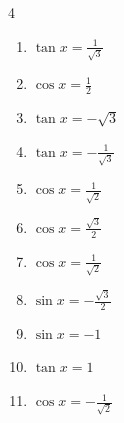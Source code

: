 \begin{multicols}{4}
\begin{enumerate}
  \item $\displaystyle \tan{x}  = \frac{1}{\sqrt{3}}$


  \item $\displaystyle \cos{x}  = \frac{1}{2}$


  \item $\displaystyle \tan{x}  = -\sqrt{3}$


\columnbreak %

  \item $\displaystyle \tan{x}  = -\frac{1}{\sqrt{3}}$


  \item $\displaystyle \cos{x}  = \frac{1}{\sqrt{2}}$


  \item $\displaystyle \cos{x}  = \frac{\sqrt{3}}{2}$


  \item $\displaystyle \cos{x}  = \frac{1}{\sqrt{2}}$


  \item $\displaystyle \sin{x}  = -\frac{\sqrt{3}}{2}$


  \item $\displaystyle \sin{x}  = -1$


  \item $\displaystyle \tan{x}  = 1$


  \item $\displaystyle \cos{x}  = -\frac{1}{\sqrt{2}}$



\end{enumerate}
\end{multicols}
